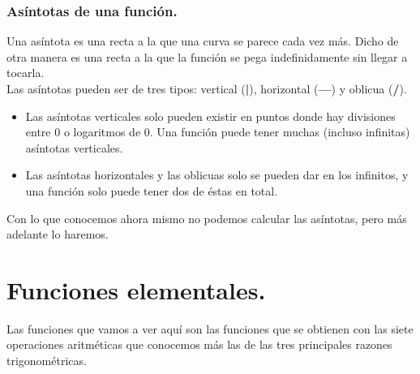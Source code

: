 \documentclass[a4paper,11pt,answers]{exam}
\begin{document}
\begin{center}
\end{center}

\subsubsection{Asíntotas de una función.}
Una asíntota es una recta a la que una curva se parece cada vez más. Dicho de otra manera es una recta a la que la función se pega indefinidamente sin llegar a tocarla.\\
Las asíntotas pueden ser de tres tipos: vertical (\textbf{|}), horizontal (\textbf{---}) y oblicua (\textbf{/}).
\begin{itemize}
	\item Las asíntotas verticales solo pueden existir en puntos donde hay divisiones entre 0 o logaritmos de 0. Una función puede tener muchas (incluso infinitas) asíntotas verticales.
	\item Las asíntotas horizontales y las oblicuas solo se pueden dar en los infinitos, y una función solo puede tener dos de éstas en total.
\end{itemize}

Con lo que conocemos ahora mismo no podemos calcular las asíntotas, pero más adelante lo haremos.

\section{Funciones elementales.}
Las funciones que vamos a ver aquí son las funciones que se obtienen con las siete operaciones aritméticas que conocemos más las de las tres principales razones trigonométricas.\\
\end{document}
